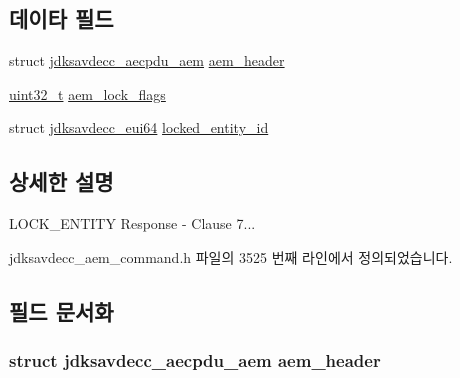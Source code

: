 \subsection*{데이타 필드}
\begin{DoxyCompactItemize}
\item 
struct \hyperlink{structjdksavdecc__aecpdu__aem}{jdksavdecc\+\_\+aecpdu\+\_\+aem} \hyperlink{structjdksavdecc__aem__command__lock__entity__response_ae1e77ccb75ff5021ad923221eab38294}{aem\+\_\+header}
\item 
\hyperlink{parse_8c_a6eb1e68cc391dd753bc8ce896dbb8315}{uint32\+\_\+t} \hyperlink{structjdksavdecc__aem__command__lock__entity__response_a6203f9642ca069acf13bc5f085acc9d0}{aem\+\_\+lock\+\_\+flags}
\item 
struct \hyperlink{structjdksavdecc__eui64}{jdksavdecc\+\_\+eui64} \hyperlink{structjdksavdecc__aem__command__lock__entity__response_a397afd1623d57ce0b39e414e537ee497}{locked\+\_\+entity\+\_\+id}
\end{DoxyCompactItemize}


\subsection{상세한 설명}
L\+O\+C\+K\+\_\+\+E\+N\+T\+I\+TY Response -\/ Clause 7... 

jdksavdecc\+\_\+aem\+\_\+command.\+h 파일의 3525 번째 라인에서 정의되었습니다.



\subsection{필드 문서화}
\subsubsection[{\texorpdfstring{aem\+\_\+header}{aem_header}}]{\setlength{\rightskip}{0pt plus 5cm}struct {\bf jdksavdecc\+\_\+aecpdu\+\_\+aem} aem\+\_\+header}\hypertarget{structjdksavdecc__aem__command__lock__entity__response_ae1e77ccb75ff5021ad923221eab38294}{}\label{structjdksavdecc__aem__command__lock__entity__response_ae1e77ccb75ff5021ad923221eab38294}


